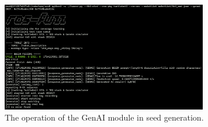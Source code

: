 

\begin{figure}[ht!]
    \centering
    \includegraphics[width=0.8\textwidth]{./figures/data/robofuzz_genai_01_fase1_arranque+semilla_random.png}
    \caption{The operation of the GenAI module in seed generation.}
    \label{fig:robofuzz_genai_01_fase1_arranque+semilla_random}
\end{figure}